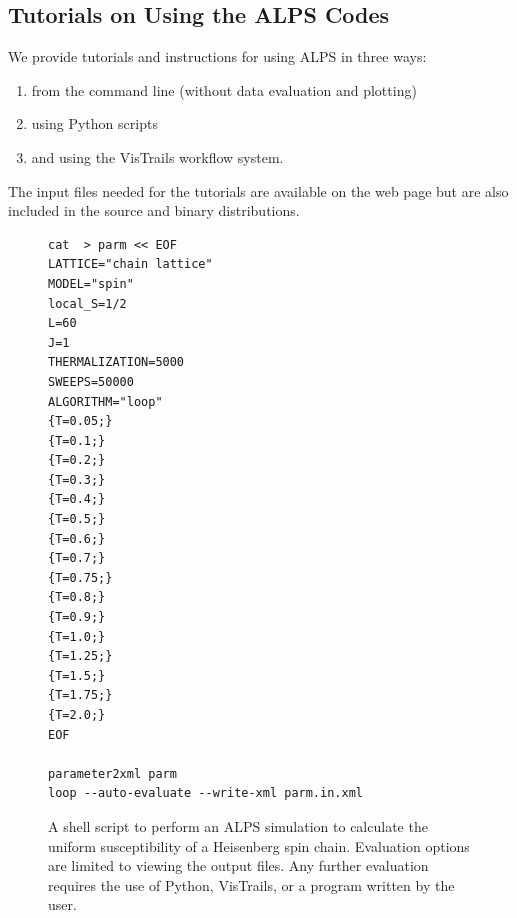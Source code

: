 \documentclass[12pt]{iopart}
\begin{document}
\subsection{Tutorials on Using the ALPS Codes}
We provide tutorials and instructions for using ALPS in three ways: 
\begin{enumerate}
\item from the command line (without data evaluation and plotting)
\item using Python scripts
\item and using the VisTrails workflow system. 
\end{enumerate}

The input files needed for the tutorials are available on the web page but are also included in the source and binary distributions.

\begin{figure}
\begin{tiny}
\begin{center}
\begin{verbatim}
cat  > parm << EOF
LATTICE="chain lattice"
MODEL="spin"
local_S=1/2
L=60
J=1
THERMALIZATION=5000
SWEEPS=50000
ALGORITHM="loop"
{T=0.05;}
{T=0.1;}
{T=0.2;}
{T=0.3;}
{T=0.4;}
{T=0.5;}
{T=0.6;}
{T=0.7;}
{T=0.75;}
{T=0.8;}
{T=0.9;}
{T=1.0;}
{T=1.25;}
{T=1.5;}
{T=1.75;}
{T=2.0;}
EOF

parameter2xml parm
loop --auto-evaluate --write-xml parm.in.xml
\end{verbatim}
\end{center}
\end{tiny}
\caption{A shell script to perform an ALPS simulation to calculate the uniform susceptibility of a Heisenberg spin chain. Evaluation options are limited to viewing the output files. Any further evaluation requires the use of Python, VisTrails, or a program written by the user.}
\label{fig:commandline}
\end{figure}
\end{document}
